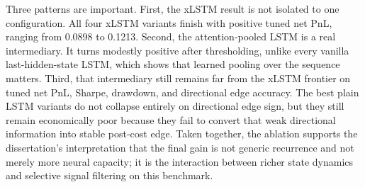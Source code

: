 \documentclass[12pt]{report}
\begin{document}
Three patterns are important. First, the xLSTM result is not isolated to one configuration. All four xLSTM variants finish with positive tuned net PnL, ranging from 0.0898 to 0.1213. Second, the attention-pooled LSTM is a real intermediary. It turns modestly positive after thresholding, unlike every vanilla last-hidden-state LSTM, which shows that learned pooling over the sequence matters. Third, that intermediary still remains far from the xLSTM frontier on tuned net PnL, Sharpe, drawdown, and directional edge accuracy. The best plain LSTM variants do not collapse entirely on directional edge sign, but they still remain economically poor because they fail to convert that weak directional information into stable post-cost edge. Taken together, the ablation supports the dissertation's interpretation that the final gain is not generic recurrence and not merely more neural capacity; it is the interaction between richer state dynamics and selective signal filtering on this benchmark.
\end{document}
